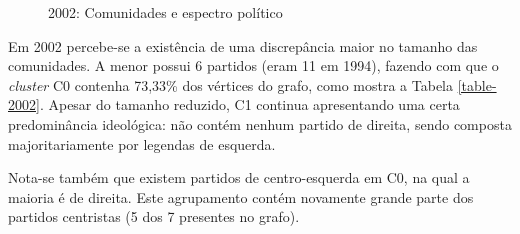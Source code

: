 \begin{figure}[H]
\center
    \qquad

    \caption{2002: Comunidades e espectro político}
\end{figure}

Em 2002 percebe-se a existência de uma discrepância maior no tamanho das comunidades. A menor possui 6 partidos (eram 11 em 1994), fazendo com que o \emph{cluster} C0 contenha 73,33\% dos vértices do grafo, como mostra a Tabela \ref{table-2002}. Apesar do tamanho reduzido, C1 continua apresentando uma certa predominância ideológica: não contém nenhum partido de direita, sendo composta majoritariamente por legendas de esquerda.

Nota-se também que existem partidos de centro-esquerda em C0, na qual a maioria é de direita. Este agrupamento contém novamente grande parte dos partidos centristas (5 dos 7 presentes no grafo).

